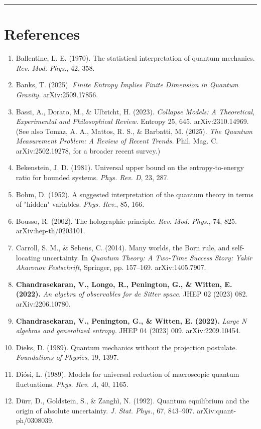 \documentclass[11pt,a4paper]{article}
\begin{document}
\medskip\hrule\medskip

\section{References}

\begin{enumerate}
  \item Ballentine, L. E. (1970). The statistical interpretation of quantum mechanics. \emph{Rev. Mod. Phys.}, 42, 358.
  \item Banks, T. (2025). \emph{Finite Entropy Implies Finite Dimension in Quantum Gravity.} arXiv:2509.17856.
  \item Bassi, A., Dorato, M., \& Ulbricht, H. (2023). \emph{Collapse Models: A Theoretical, Experimental and Philosophical Review.} Entropy 25, 645. arXiv:2310.14969. (See also Tomaz, A. A., Mattos, R. S., \& Barbatti, M. (2025). \emph{The Quantum Measurement Problem: A Review of Recent Trends.} Phil. Mag. C. arXiv:2502.19278, for a broader recent survey.)
  \item Bekenstein, J. D. (1981). Universal upper bound on the entropy-to-energy ratio for bounded systems. \emph{Phys. Rev. D}, 23, 287.
  \item Bohm, D. (1952). A suggested interpretation of the quantum theory in terms of "hidden" variables. \emph{Phys. Rev.}, 85, 166.
  \item Bousso, R. (2002). The holographic principle. \emph{Rev. Mod. Phys.}, 74, 825. arXiv:hep-th/0203101.
  \item Carroll, S. M., \& Sebens, C. (2014). Many worlds, the Born rule, and self-locating uncertainty. In \emph{Quantum Theory: A Two-Time Success Story: Yakir Aharonov Festschrift}, Springer, pp. 157–169. arXiv:1405.7907.
  \item \textbf{Chandrasekaran, V., Longo, R., Penington, G., \& Witten, E. (2022).} \emph{An algebra of observables for de Sitter space.} JHEP 02 (2023) 082. arXiv:2206.10780.
  \item \textbf{Chandrasekaran, V., Penington, G., \& Witten, E. (2022).} \emph{Large N algebras and generalized entropy.} JHEP 04 (2023) 009. arXiv:2209.10454.
  \item Dieks, D. (1989). Quantum mechanics without the projection postulate. \emph{Foundations of Physics}, 19, 1397.
  \item Diósi, L. (1989). Models for universal reduction of macroscopic quantum fluctuations. \emph{Phys. Rev. A}, 40, 1165.
  \item Dürr, D., Goldstein, S., \& Zanghì, N. (1992). Quantum equilibrium and the origin of absolute uncertainty. \emph{J. Stat. Phys.}, 67, 843–907. arXiv:quant-ph/0308039.

\end{enumerate}
\end{document}
